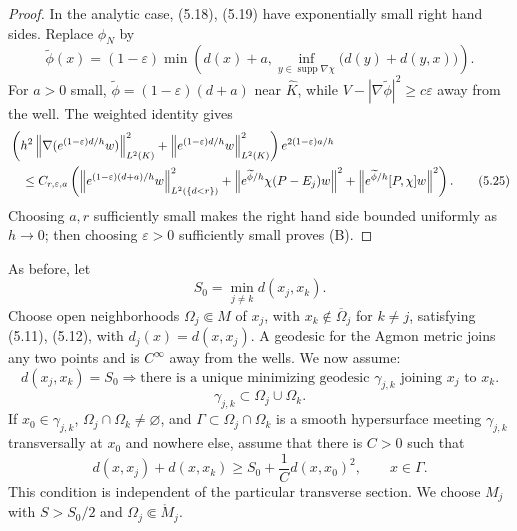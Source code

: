 \documentclass[11pt,a4paper]{article}
\newcommand{\supp}{\operatorname{supp}}
\newcommand{\eps}{\varepsilon}
\newcommand{\norm}[1]{\left\lVert #1\right\rVert}
\numberwithin{equation}{section}
\theoremstyle{remark}
\begin{document}
\begin{proof}
In the analytic case, (5.18), (5.19) have exponentially small right hand sides. Replace $\phi_N$ by
\begin{equation}
\widetilde\phi(x)=(1-\eps)\min\left(
 d(x)+a,
 \inf_{y\in\supp\nabla\chi}\bigl(d(y)+d(y,x)\bigr)
\right).
\tag{5.24}
\end{equation}
For $a>0$ small, $\widetilde\phi=(1-\eps)(d+a)$ near $\widehat K$, while $V-|\nabla\widetilde\phi|^2\ge c\eps$ away from the well. The weighted identity gives
\begin{align}
&\left(
 h^2\norm{\nabla(e^{(1-\eps)d/h}w)}_{L^2(K)}^2
 +\norm{e^{(1-\eps)d/h}w}_{L^2(K)}^2
 \right)e^{2(1-\eps)a/h} \notag\\
&\quad\le C_{r,\eps,a}\left(
 \norm{e^{(1-\eps)(d+a)/h}w}_{L^2(\{d<r\})}^2
 +\norm{e^{\widetilde\phi/h}\chi(P-E_j)w}^2
 +\norm{e^{\widetilde\phi/h}[P,\chi]w}^2
\right).
\tag{5.25}
\end{align}
Choosing $a,r$ sufficiently small makes the right hand side bounded uniformly as $h\to0$; then choosing $\eps>0$ sufficiently small proves (B).
\end{proof}

As before, let
\[
S_0=\min_{j\ne k}d(x_j,x_k).
\]
Choose open neighborhoods $\Omega_j\Subset M$ of $x_j$, with $x_k\notin\overline\Omega_j$ for $k\ne j$, satisfying (5.11), (5.12), with $d_j(x)=d(x,x_j)$. A geodesic for the Agmon metric joins any two points and is $C^\infty$ away from the wells. We now assume:
\begin{equation}
 d(x_j,x_k)=S_0\Longrightarrow
 \text{there is a unique minimizing geodesic }\gamma_{j,k}
 \text{ joining }x_j\text{ to }x_k.
\tag{5.26}
\end{equation}
\begin{equation}
\gamma_{j,k}\subset\Omega_j\cup\Omega_k.
\tag{5.27}
\end{equation}
If $x_0\in\gamma_{j,k}$, $\Omega_j\cap\Omega_k\ne\varnothing$, and $\Gamma\subset\Omega_j\cap\Omega_k$ is a smooth hypersurface meeting $\gamma_{j,k}$ transversally at $x_0$ and nowhere else, assume that there is $C>0$ such that
\begin{equation}
d(x,x_j)+d(x,x_k)
\ge S_0+\frac1C d(x,x_0)^2,
\qquad x\in\Gamma.
\tag{5.28}
\end{equation}
This condition is independent of the particular transverse section. We choose $M_j$ with $S>S_0/2$ and $\Omega_j\Subset\mathring M_j$.
\end{document}

